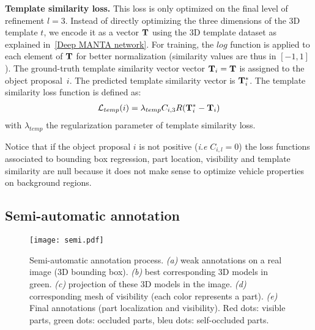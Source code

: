 \documentclass[10pt,twocolumn,letterpaper]{article}
\begin{document}
\textbf{Template similarity loss.} This loss is only optimized on the final level of refinement $l=3$. Instead of directly optimizing the three dimensions of the 3D template $t$, we encode it as a vector $\bold{T}$ using the 3D template dataset as explained in~\ref{Deep MANTA network}. For training, the $log$ function is applied to each element of $\bold{T}$ for better normalization (similarity values are thus in $[-1,1]$). The ground-truth template similarity vector vector $\bold{T}_{i} = \bold{T}$ is assigned to the object proposal~$i$. The predicted template similarity vector is $\bold{T}^*_{i}$. The template similarity loss function is defined as:
\begin{align}
\mathcal{L}_{temp}(i) = \lambda_{temp} C_{i,3} R({\bold{T}_{i}^{*}} - \bold{T}_{i}) \notag
\end{align}
with $\lambda_{temp}$ the regularization parameter of template similarity loss. 

Notice that if the object proposal $i$ is not positive (\textit{i.e} $C_{i,l} = 0$) the loss functions associated to bounding box regression, part location, visibility and template similarity are null because it does not make sense to optimize vehicle properties on background regions.

\subsection{Semi-automatic annotation}
\label{semi}

\begin{figure*}[ht]
\center
\texttt{[image: semi.pdf]}
\vspace{-0mm}
\caption{Semi-automatic annotation process. \textit{(a)} weak annotations on a real image (3D bounding box). \textit{(b)} best corresponding 3D models in green. \textit{(c)} projection of these 3D models in the image. \textit{(d)} corresponding mesh of visibility (each color represents a part). \textit{(e)} Final annotations (part localization and visibility). Red dots: visible parts, green dots: occluded parts, bleu dots: self-occluded parts. }
\label{fig:semi_img}
\end{figure*}
\end{document}

